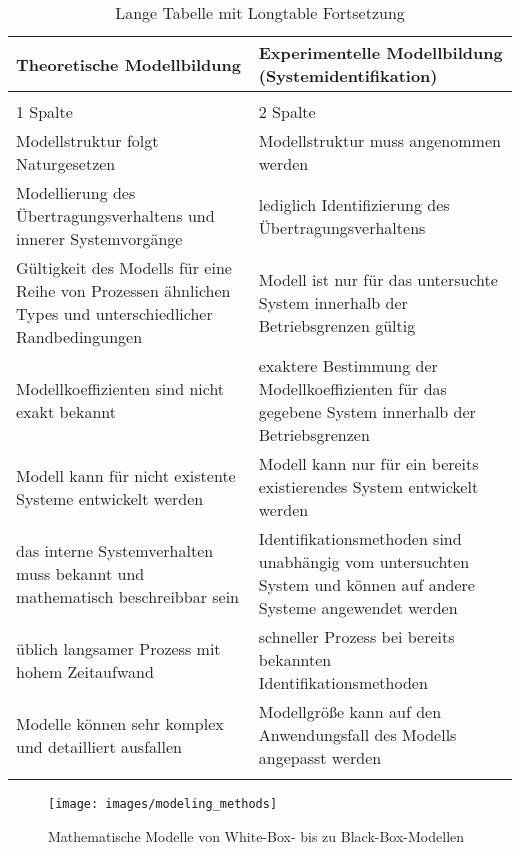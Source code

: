 \begin{longtable}{p{7.0cm} p{7.0cm}}
	\caption{Eigenschaften theoretischer und experimenteller Modellierungsansätze \cite{Isermann.2011}} \\ \toprule
	Theoretische Modellbildung & Experimentelle Modellbildung (Systemidentifikation) \\
	\hline
	\endfirsthead %
	\caption{Lange Tabelle mit Longtable Fortsetzung}\\
	1 Spalte & 2 Spalte\\
	\hline
	\endhead %
	\hline
	
	Modellstruktur folgt Naturgesetzen & Modellstruktur muss angenommen werden\\ \hline
	Modellierung des Übertragungsverhaltens und innerer Systemvorgänge & lediglich Identifizierung des Übertragungsverhaltens\\ \hline
	Gültigkeit des Modells für eine Reihe von Prozessen ähnlichen Types und unterschiedlicher Randbedingungen & Modell ist nur für das untersuchte System innerhalb der Betriebsgrenzen gültig\\ \hline
	Modellkoeffizienten sind nicht exakt bekannt & exaktere Bestimmung der Modellkoeffizienten für das gegebene System innerhalb der Betriebsgrenzen\\ \hline
	Modell kann für nicht existente Systeme entwickelt werden & Modell kann nur für ein bereits existierendes System entwickelt werden\\ \hline
	das interne Systemverhalten muss bekannt und mathematisch beschreibbar sein & Identifikationsmethoden sind unabhängig vom untersuchten System und können auf andere Systeme angewendet werden\\ \hline
	üblich langsamer Prozess mit hohem Zeitaufwand & schneller Prozess bei bereits bekannten Identifikationsmethoden\\ \hline
	Modelle können sehr komplex und detailliert ausfallen & Modellgröße kann auf den Anwendungsfall des Modells angepasst werden\\
	\bottomrule
	\label{tab:modeling_methods} 
\end{longtable}


\begin{figure} 
	\centering
	\texttt{[image: images/modeling\_methods]}
	\caption{Mathematische Modelle von White-Box- bis zu Black-Box-Modellen \cite{Isermann.2011}}
	\label{fig:modeling_methods}
\end{figure}

